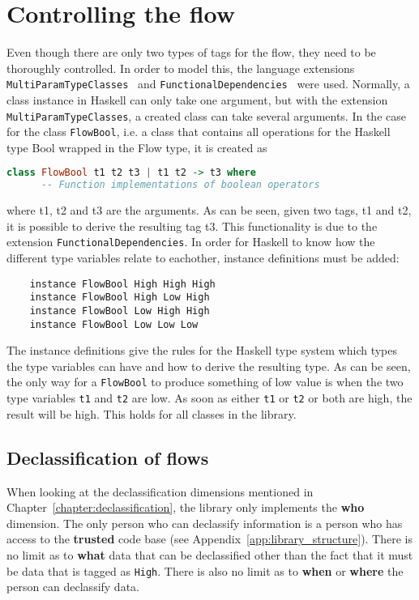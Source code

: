 \section{Controlling the flow}
Even though there are only two types of tags for the flow, they need to be thoroughly controlled. In order to model this, the language extensions {\tt MultiParamTypeClasses}~\cite{haskell-multiparamtypeclasses} and {\tt FunctionalDependencies}~\cite{haskell-functionaldependencies} were used. Normally, a class instance in Haskell can only take one argument, but with the extension {\tt MultiParamTypeClasses}, a created class can take several arguments. In the case for the class {\tt FlowBool}, i.e. a class that contains all operations for the Haskell type Bool wrapped in the Flow type, it is created as
\begin{center}
  \begin{lstlisting}[language=Haskell]
    class FlowBool t1 t2 t3 | t1 t2 -> t3 where
      -- Function implementations of boolean operators
  \end{lstlisting}
\end{center}
where t1, t2 and t3 are the arguments. As can be seen, given two tags, t1 and t2, it is possible to derive the resulting tag t3. This functionality is due to the extension {\tt FunctionalDependencies}. In order for Haskell to know how the different type variables relate to eachother, instance definitions must be added:
\begin{verbatim}
    instance FlowBool High High High
    instance FlowBool High Low High
    instance FlowBool Low High High
    instance FlowBool Low Low Low
\end{verbatim}
The instance definitions give the rules for the Haskell type system which types the type variables can have and how to derive the resulting type. As can be seen, the only way for a {\tt FlowBool} to produce something of low value is when the two type variables {\tt t1} and {\tt t2} are low. As soon as either {\tt t1} or {\tt t2} or both are high, the result will be high. This holds for all classes in the library.

\subsection{Declassification of flows}
When looking at the declassification dimensions mentioned in Chapter~\ref{chapter:declassification}, the library only implements the \textbf{who} dimension. The only person who can declassify information is a person who has access to the \textbf{trusted} code base (see Appendix~\ref{app:library_structure}). There is no limit as to \textbf{what} data that can be declassified other than the fact that it must be data that is tagged as {\tt High}. There is also no limit as to \textbf{when} or \textbf{where} the person can declassify data.


